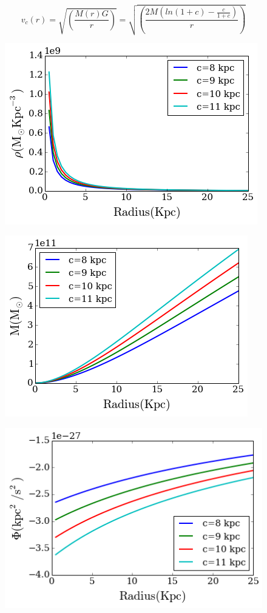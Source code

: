 \documentclass[a4paper, 12pt]{article} %
\begin{document}
\begin{equation}\label{vcNFW}
v_c(r) = \sqrt{\left(\dfrac{M(r)G}{r}\right)} = \sqrt{\left( \dfrac{2 M  \left(  ln(1 + c) - \frac{c}{1 + c} \right)}{r} \right)}
\end{equation}


\begin{figure}[H]
\centering
\includegraphics[scale=0.7]{NFW_density.png}
\end{figure}

\begin{figure}[H]
\centering
\includegraphics[scale=0.7]{NFW_mass.png}
\end{figure}

\begin{figure}[H]
\centering
\includegraphics[scale=0.7]{NFW_potential.png}
\end{figure}
\end{document}
